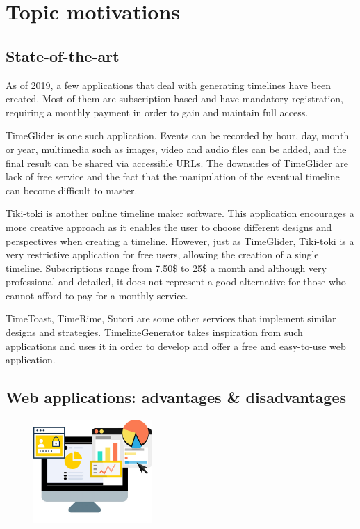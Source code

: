 \documentclass{report}
\begin{document}
\newpage

\chapter {Topic motivations}

\section {State-of-the-art}

As of 2019, a few applications that deal with generating timelines have been created. Most of them are subscription based and have mandatory registration, requiring a monthly payment in order to gain and maintain full access.\par

TimeGlider is one such application. Events can be recorded by hour, day, month or year, multimedia such as images, video and audio files can be added, and the final result can be shared via accessible URLs. The downsides of TimeGlider are lack of free service and the fact that the manipulation of the eventual timeline can become difficult to master.\par

Tiki-toki is another online timeline maker software. This application encourages a more creative approach as it enables the user to choose different designs and perspectives when creating a timeline. However, just as TimeGlider, Tiki-toki is a very restrictive application for free users, allowing the creation of a single timeline. Subscriptions range from 7.50\$ to 25\$ a month and although very professional and detailed, it does not represent a good alternative for those who cannot afford to pay for a monthly service.\par

TimeToast, TimeRime, Sutori are some other services that implement similar designs and strategies. TimelineGenerator takes inspiration from such applications and uses it in order to develop and offer a free and easy-to-use web application.\par

\section {Web applications: advantages \& disadvantages}

\begin{figure}
	\vspace*{-1cm}
    \centering
    \includegraphics[width=0.4\textwidth]{web}
	\vspace{-10pt} 
\end{figure}
\end{document}
